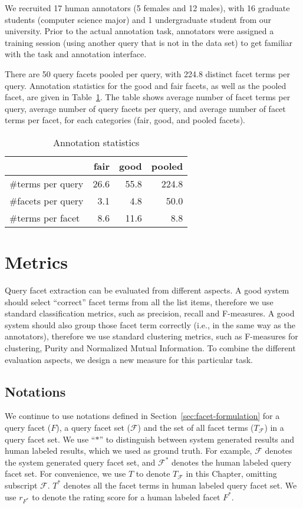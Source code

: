 We recruited 17 human annotators (5 females and 12 males), with 16 graduate students (computer science major) and 1 undergraduate student from our university. Prior to the actual annotation task, annotators were assigned a training session (using another query that is not in the data set) to get familiar with the task and annotation interface.

There are 50 query facets pooled per query, with 224.8 distinct facet terms per query. Annotation statistics for the good and fair facets, as well as the pooled facet, are given in Table~\ref{tab:annotations}. The table shows average number of facet terms per query, average number of query facets per query, and average number of facet terms per facet, for each categories (fair, good, and pooled facets).
\begin{table}[ht!]
\centering
\caption{Annotation statistics}
\label{tab:annotations}
\begin{tabular}{|l|r|r|r|} \hline
& fair & good & pooled\\ \hline
\#terms per query & 26.6 & 55.8 & 224.8\\ 
\#facets per query & 3.1 & 4.8 & 50.0 \\ 
\#terms per facet & 8.6 & 11.6 & 8.8 \\ \hline
\end{tabular}
\end{table}

\section{Metrics} 
\label{sec:ie-metrics}
Query facet extraction can be evaluated from different aspects. A good system should select ``correct'' facet terms from all the list items, therefore we use standard classification metrics, such as precision, recall and F-measures. A good system should also group those facet term correctly (i.e., in the same way as the annotators), therefore we use standard clustering metrics, such as F-measures for clustering, Purity and Normalized Mutual Information. To combine the different evaluation aspects, we design a new measure for this particular task.
\subsection{Notations} \label{sec:evalmetrics}
We continue to use notations defined in Section~\ref{sec:facet-formulation} for a query facet ($F$), a query facet set ($\mathcal{F}$) and the set of all facet terms ($T_{\mathcal{F}}$) in a query facet set. We use ``$*$'' to distinguish between system generated results and human labeled results, which we used as ground truth.
For example, $\mathcal{F}$ denotes the system generated query facet set, and $\mathcal{F}^*$ denotes the human labeled query facet set.
For convenience, we use $T$ to denote $T_{\mathcal{F}}$ in this Chapter, omitting subscript $\mathcal{F}$.
$T^*$ denotes all the facet terms in human labeled query facet set.
We use $r_{F^*}$ to denote the rating score for a human labeled facet $F^*$.

